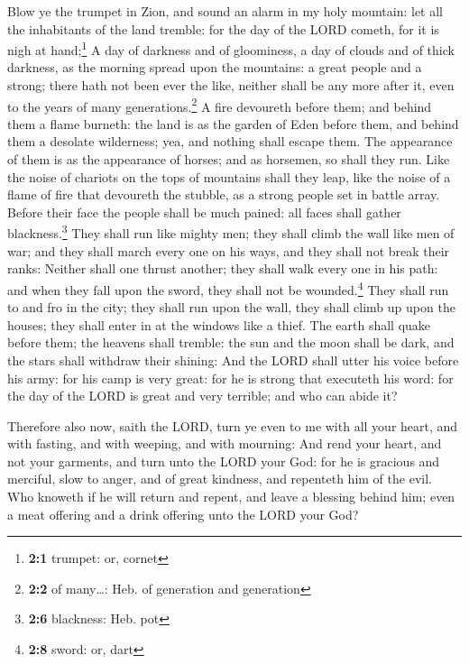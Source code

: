  Blow ye the trumpet in Zion, and sound an alarm in my
holy mountain: let all the inhabitants of the land tremble: for the day
of the LORD cometh, for it is nigh at hand;\footnote{\textbf{2:1}
  trumpet: or, cornet}  A day of darkness and of
gloominess, a day of clouds and of thick darkness, as the morning spread
upon the mountains: a great people and a strong; there hath not been
ever the like, neither shall be any more after it, even to the years of
many generations.\footnote{\textbf{2:2} of many\ldots: Heb. of
  generation and generation}  A fire devoureth before
them; and behind them a flame burneth: the land is as the garden of Eden
before them, and behind them a desolate wilderness; yea, and nothing
shall escape them.  The appearance of them is as the
appearance of horses; and as horsemen, so shall they run. 
Like the noise of chariots on the tops of mountains shall they leap,
like the noise of a flame of fire that devoureth the stubble, as a
strong people set in battle array.  Before their face the
people shall be much pained: all faces shall gather
blackness.\footnote{\textbf{2:6} blackness: Heb. pot} 
They shall run like mighty men; they shall climb the wall like men of
war; and they shall march every one on his ways, and they shall not
break their ranks:  Neither shall one thrust another; they
shall walk every one in his path: and when they fall upon the sword,
they shall not be wounded.\footnote{\textbf{2:8} sword: or, dart}
 They shall run to and fro in the city; they shall run
upon the wall, they shall climb up upon the houses; they shall enter in
at the windows like a thief.  The earth shall quake
before them; the heavens shall tremble: the sun and the moon shall be
dark, and the stars shall withdraw their shining:  And
the LORD shall utter his voice before his army: for his camp is very
great: for he is strong that executeth his word: for the day of the LORD
is great and very terrible; and who can abide it?

 Therefore also now, saith the LORD, turn ye even to me
with all your heart, and with fasting, and with weeping, and with
mourning:  And rend your heart, and not your garments,
and turn unto the LORD your God: for he is gracious and merciful, slow
to anger, and of great kindness, and repenteth him of the evil.
 Who knoweth if he will return and repent, and leave a
blessing behind him; even a meat offering and a drink offering unto the
LORD your God?

